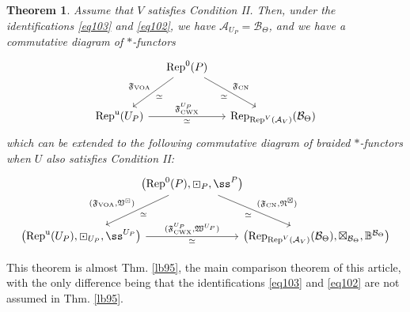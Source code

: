 \documentclass[11pt,b5paper,notitlepage]{article}
\theoremstyle{definition}
\theoremstyle{plain}
\newtheorem{thm}[df]{Theorem}
\newcommand{\fk}{\mathfrak}
\newcommand{\mc}{\mathcal}
\newcommand{\Rep}{\mathrm{Rep}}
\newcommand{\CWX}{{\scriptscriptstyle \mathrm{CWX}}}
\newcommand{\VOA}{{\scriptscriptstyle \mathrm{VOA}}}
\newcommand{\CN}{{\scriptscriptstyle \mathrm{CN}}}
\newcommand{\RepUP}{\mathrm{Rep}^{\mathrm u}(U_P)}
\numberwithin{equation}{section}
\begin{document}
\begin{thm}
Assume that $V$ satisfies Condition II. Then, under the identifications \eqref{eq103} and \eqref{eq102}, we have $\mc A_{U_P}=\mc B_\Theta$, and we have a commutative diagram of $*$-functors
\begin{equation}\label{eq100}
\begin{tikzcd}[row sep=large, column sep=small]
             & \Rep^0(P) \arrow[ld,"\simeq","\fk F_\VOA"'] \arrow[rd,"\fk F_\CN","\simeq"'] &   \\
\RepUP \arrow[rr,"{\fk F^{U_P}_\CWX}","\simeq"'] &                         & \Rep_{\Rep^V(\mc A_V)}(\mc B_\Theta)
\end{tikzcd}
\end{equation}
which can be extended to the following commutative diagram of braided $*$-functors when $U$ also satisfies Condition II:
\begin{equation}\label{eq101}
\begin{tikzcd}[row sep=large, column sep=-0.3cm]
             & \big(\Rep^0(P),\boxdot_P,\ss^P\big) \arrow[ld,"\simeq","{(\fk F_\VOA,\fk V^\boxdot)}"'] \arrow[rd,"{(\fk F_\CN,\fk N^\boxtimes)}","\simeq"'] &   \\
\big(\RepUP,\boxdot_{U_P},\ss^{U_P}\big) \arrow[rr,"{(\fk F^{U_P}_\CWX,\fk W^{U_P})}","\simeq"'] &                         & \big(\Rep_{\Rep^V(\mc A_V)}(\mc B_\Theta),\boxtimes_{\mc B_\Theta},\mathbb B^{\mc B_\Theta}\big)
\end{tikzcd}
\end{equation}
\end{thm}

This theorem is almost Thm. \ref{lb95}, the main comparison theorem of this article, with the only difference being that the identifications \eqref{eq103} and \eqref{eq102} are not assumed in Thm. \ref{lb95}.
\end{document}
